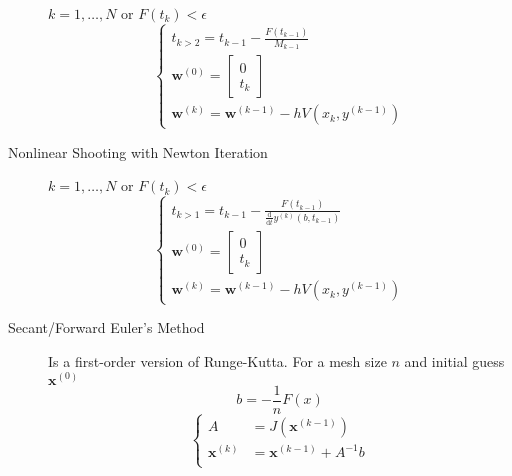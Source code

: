 \documentclass[8pt]{article}
\newcommand{\dd}[1]{\mathrm{d}{#1}}
\newcommand{\ddt}[1]{\frac{\dd{}}{\dd{#1}}}
\begin{document}
\begin{multicols}{2}
\begin{description}
    $k=1,\ldots,N$ or $F(t_k)<\epsilon$
    \begin{equation*}
      \left\{
        \begin{array}{c}
          t_{k>2}=t_{k-1}-\frac{F(t_{k-1})}{M_{k-1}} \\
          \mathbf{w}^{(0)} =
          \left[\begin{smallmatrix}
            0 \\ t_k
          \end{smallmatrix}\right] \\
          \mathbf{w}^{(k)} = \mathbf{w}^{(k-1)} - hV(x_k,y^{(k-1)})
        \end{array}
      \right.
    \end{equation*}

  \item[Nonlinear Shooting with Newton Iteration]
    $k=1,\ldots,N$ or $F(t_k)<\epsilon$
    \begin{equation*}
      \left\{
        \begin{array}{c}
          t_{k>1}=t_{k-1}-\frac{F(t_{k-1})}{\ddt{t}y^{(k)}(b,t_{k-1})} \\
          \mathbf{w}^{(0)} =
          \left[\begin{smallmatrix}
            0 \\ t_k
          \end{smallmatrix}\right] \\
          \mathbf{w}^{(k)} = \mathbf{w}^{(k-1)} - hV(x_k,y^{(k-1)})
        \end{array}
      \right.
    \end{equation*}

  \item[Secant/Forward Euler's Method] Is a first-order version of Runge-Kutta. For a mesh size $n$ and
    initial guess $\mathbf{x}^{(0)}$
    \begin{equation*}
      b=-\frac{1}{n}F(x)
    \end{equation*}
    \begin{equation*}
      \left\{
        \begin{aligned}
          A &= J(\mathbf{x}^{(k-1)}) \\
          \mathbf{x}^{(k)} &= \mathbf{x}^{(k-1)}+ A^{-1}b \\
        \end{aligned}
      \right.
    \end{equation*}


\end{description}
\end{multicols}
\end{document}

